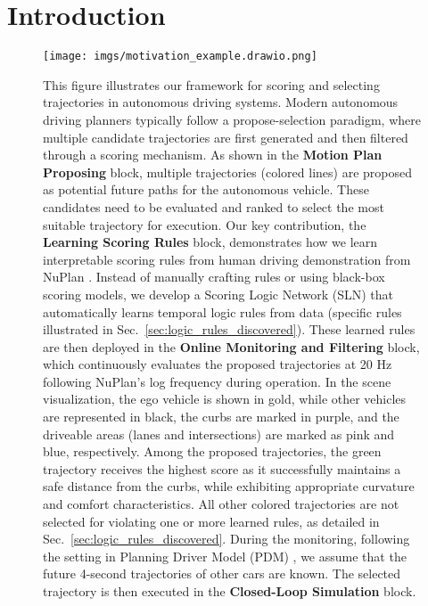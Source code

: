 \section{Introduction}
\label{sec:intro}

\begin{figure}[ht!]
    \centering
    \texttt{[image: imgs/motivation\_example.drawio.png]}
    \caption{ This figure illustrates our framework for scoring and selecting trajectories in autonomous driving systems. Modern autonomous driving planners typically follow a propose-selection paradigm, where multiple candidate trajectories are first generated and then filtered through a scoring mechanism. As shown in the \textbf{Motion Plan Proposing} block, multiple trajectories (colored lines) are proposed as potential future paths for the autonomous vehicle. These candidates need to be evaluated and ranked to select the most suitable trajectory for execution. Our key contribution, the \textbf{Learning Scoring Rules} block, demonstrates how we learn interpretable scoring rules from human driving demonstration from NuPlan \cite{Karnchanachari2024TowardsLP}. Instead of manually crafting rules or using black-box scoring models, we develop a Scoring Logic Network (SLN) that automatically learns temporal logic rules from data (specific rules illustrated in Sec.~\ref{sec:logic_rules_discovered}). These learned rules are then deployed in the \textbf{Online Monitoring and Filtering} block, which continuously evaluates the proposed trajectories at 20 Hz following NuPlan's log frequency \cite{Karnchanachari2024TowardsLP} during operation. In the scene visualization, the ego vehicle is shown in gold, while other vehicles are represented in black, the curbs are marked in purple, and the driveable areas (lanes and intersections) are marked as pink and blue, respectively. Among the proposed trajectories, the green trajectory receives the highest score as it successfully maintains a safe distance from the curbs, while exhibiting appropriate curvature and comfort characteristics. All other colored trajectories are not selected for violating one or more learned rules, as detailed in Sec.~\ref{sec:logic_rules_discovered}. During the monitoring, following the setting in Planning Driver Model (PDM) \cite{Dauner2023CORL}, we assume that the future 4-second trajectories of other cars are known. The selected trajectory is then executed in the \textbf{Closed-Loop Simulation} block.
    }
    \label{fig:motivation_example}
\end{figure}

